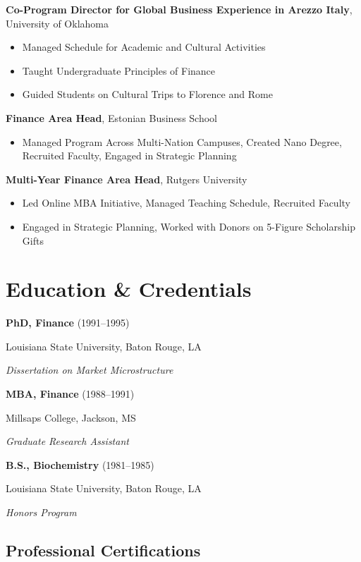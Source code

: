 \documentclass[11pt,a4paper,]{awesome-cv}
\begin{document}
\textbf{Co-Program Director for Global Business Experience in Arezzo Italy},
University of Oklahoma

\begin{itemize}
\item Managed Schedule for Academic and Cultural Activities
\item Taught Undergraduate Principles of Finance
\item Guided Students on Cultural Trips to Florence and Rome
\end{itemize}

\textbf{Finance Area Head}, Estonian Business School

\begin{itemize}
\item Managed Program Across Multi-Nation Campuses, Created Nano Degree, Recruited Faculty, Engaged in Strategic Planning
\end{itemize}

\textbf{Multi-Year Finance Area Head}, Rutgers University

\begin{itemize}
\item Led Online MBA Initiative, Managed Teaching Schedule, Recruited Faculty
\item Engaged in Strategic Planning, Worked with Donors on 5-Figure Scholarship Gifts
\end{itemize}

\section{Education \& Credentials}\label{education-credentials}

\textbf{PhD, Finance} (1991--1995)

Louisiana State University, Baton Rouge, LA

\textit{Dissertation on Market Microstructure}

\textbf{MBA, Finance} (1988--1991)

Millsaps College, Jackson, MS

\textit{Graduate Research Assistant}

\textbf{B.S., Biochemistry} (1981--1985)

Louisiana State University, Baton Rouge, LA

\textit{Honors Program}

\subsection{Professional Certifications}
\end{document}
